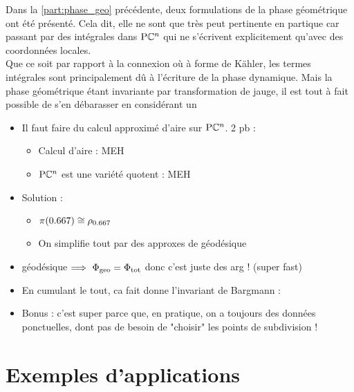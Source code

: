 Dans la \cref{part:phase_geo} précédente, deux formulations de la phase géométrique ont été présenté. Cela dit, elle ne sont que très peut pertinente en partique car passant par des intégrales dans $\text{\normalfont P}\mathbb{C}^{n}$ qui ne s'écrivent explicitement qu'avec des coordonnées locales.
\\
Que ce soit par rapport à la connexion où à forme de Kähler, les termes intégrales sont principalement dû à l'écriture de la phase dynamique. Mais la phase géométrique étant invariante par transformation de jauge, il est tout à fait possible de s'en débarasser en considérant un
\begin{itemize}
	
	\item Il faut faire du calcul approximé d'aire sur $\text{\normalfont P}\mathbb{C}^{n}$. 2 pb : \begin{itemize}
		
		\item Calcul d'aire : MEH
		
		\item  $\text{\normalfont P}\mathbb{C}^{n}$ est une variété quotent : MEH
		
	\end{itemize}
	
	\item Solution : \begin{itemize}
		
		\item $\pi(\x) \cong \rho_{\x}$
		
		\item On simplifie tout par des approxes de géodésique
	\end{itemize}
	
	\item géodésique $\Longrightarrow\ \Phi_{\text{\normalfont geo}} = \Phi_{\text{\normalfont tot}}$ donc c'est juste des arg ! (super fast)
	
	\item En cumulant le tout, ca fait donne l'invariant de Bargmann :
	
	\item Bonus : c'est super parce que, en pratique, on a toujours des données ponctuelles, dont pas de besoin de "choisir" les points de subdivision !
\end{itemize}




\section{\todo Exemples d'applications} \label{sec:exemples_appli}

